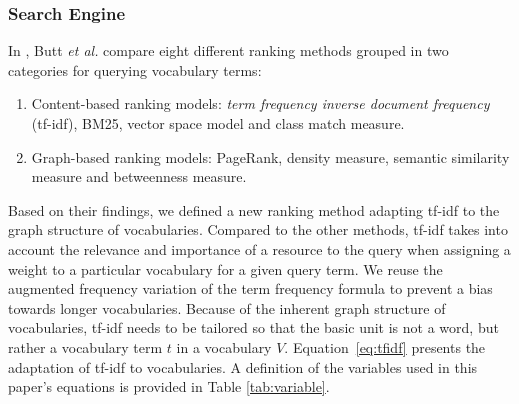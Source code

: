 \documentclass{iosart2c}
\begin{document}
	

\subsubsection{Search Engine}\label{sssec:search}
In \cite{butt2014}, Butt \emph{et al.} compare eight different ranking methods grouped in two categories for querying vocabulary terms:
\begin{enumerate}
	\item Content-based ranking models: \emph{term frequency inverse document frequency} (tf-idf), BM25, vector space model and class match measure.
	\item Graph-based ranking models: PageRank, density measure, semantic similarity measure and betweenness measure.
\end{enumerate}
Based on their findings, we defined a new ranking method adapting tf-idf to the graph structure of vocabularies. Compared to the other methods, tf-idf takes into account the relevance and importance of a resource to the query when assigning a weight to a particular vocabulary for a given query term. We reuse the augmented frequency variation of the term frequency formula to prevent a bias towards longer vocabularies. Because of the inherent graph structure of vocabularies, tf-idf needs to be tailored so that the basic unit is not a word, but rather a vocabulary term $t$ in a vocabulary $V$. Equation~\ref{eq:tfidf} presents the adaptation of tf-idf to vocabularies. A definition of the variables used in this paper's equations is provided in Table \ref{tab:variable}. 
\end{document}
